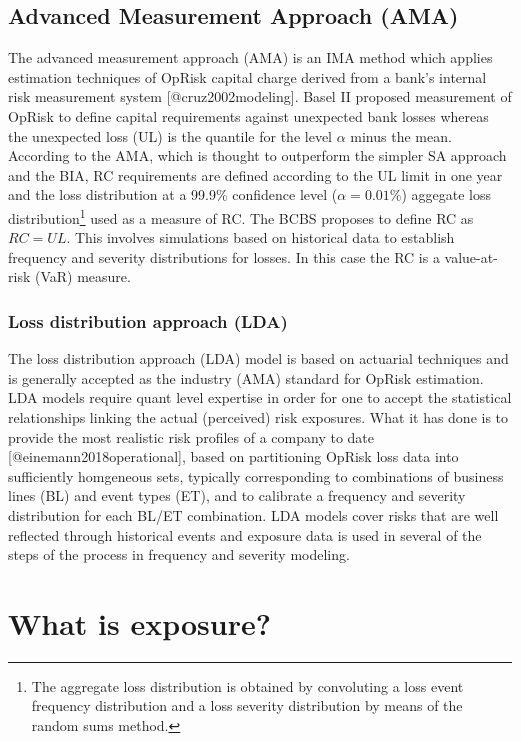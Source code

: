 \documentclass[]{article}
\let\rmarkdownfootnote\footnote%
\def\footnote{\protect\rmarkdownfootnote}
\begin{document}
\subsection{Advanced Measurement Approach (AMA)}
\label{sec:Advanced Measurement Approach (AMA)}

The advanced measurement approach (AMA) is an IMA method which applies
estimation techniques of OpRisk capital charge derived from a bank's
internal risk measurement system {[}@cruz2002modeling{]}. Basel II
proposed measurement of OpRisk to define capital requirements against
unexpected bank losses whereas the unexpected loss (UL) is the quantile
for the level \(\alpha\) minus the mean. According to the AMA, which is
thought to outperform the simpler SA approach and the BIA, RC
requirements are defined according to the UL limit in one year and the
loss distribution at a 99.9\% confidence level (\(\alpha = 0.01\%\))
aggegate loss
distribution\footnote{The aggregate loss distribution is obtained by convoluting a loss event frequency distribution and a loss severity distribution by means of the random sums method.}
used as a measure of RC. The BCBS proposes to define RC as \(RC = UL\).
This involves simulations based on historical data to establish
frequency and severity distributions for losses. In this case the RC is
a value-at-risk (VaR) measure.\medskip

\subsubsection{Loss distribution approach (LDA)}
\label{sssec:Loss distribution approach (LDA)}

The loss distribution approach (LDA) model is based on actuarial
techniques and is generally accepted as the industry (AMA) standard for
OpRisk estimation. LDA models require quant level expertise in order for
one to accept the statistical relationships linking the actual
(perceived) risk exposures. What it has done is to provide the most
realistic risk profiles of a company to date
{[}@einemann2018operational{]}, based on partitioning OpRisk loss data
into sufficiently homgeneous sets, typically corresponding to
combinations of business lines (BL) and event types (ET), and to
calibrate a frequency and severity distribution for each BL/ET
combination. LDA models cover risks that are well reflected through
historical events and exposure data is used in several of the steps of
the process in frequency and severity modeling.\medskip

\section{What is exposure?}
\label{sec:What is exposure?}
\end{document}

